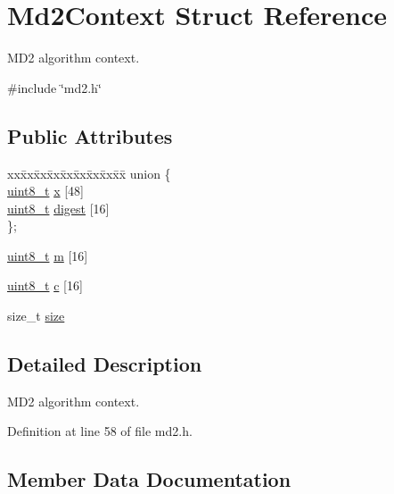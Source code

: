 \hypertarget{structMd2Context}{}\section{Md2\+Context Struct Reference}
\label{structMd2Context}


M\+D2 algorithm context.  




{\ttfamily \#include \char`\"{}md2.\+h\char`\"{}}

\subsection*{Public Attributes}
\begin{DoxyCompactItemize}
\item 
\begin{tabbing}
xx\=xx\=xx\=xx\=xx\=xx\=xx\=xx\=xx\=\kill
union \{\\
\>\hyperlink{stdint_8h_aba7bc1797add20fe3efdf37ced1182c5}{uint8\_t} \hyperlink{structMd2Context_afea5eca1b34ddac53fa3f49846167bc4}{x} \mbox{[}48\mbox{]}\\
\>\hyperlink{stdint_8h_aba7bc1797add20fe3efdf37ced1182c5}{uint8\_t} \hyperlink{structMd2Context_abbf42a8e93b5e5f22636477a6efa361a}{digest} \mbox{[}16\mbox{]}\\
\}; \\

\end{tabbing}\item 
\hyperlink{stdint_8h_aba7bc1797add20fe3efdf37ced1182c5}{uint8\+\_\+t} \hyperlink{structMd2Context_a2e9be22ee68833109610d431d0ec7752}{m} \mbox{[}16\mbox{]}
\item 
\hyperlink{stdint_8h_aba7bc1797add20fe3efdf37ced1182c5}{uint8\+\_\+t} \hyperlink{structMd2Context_abefd310eb88918040e120d90d2869256}{c} \mbox{[}16\mbox{]}
\item 
size\+\_\+t \hyperlink{structMd2Context_a257b9952c3fd0ad1c5fcc27c2883aa2f}{size}
\end{DoxyCompactItemize}


\subsection{Detailed Description}
M\+D2 algorithm context. 

Definition at line 58 of file md2.\+h.



\subsection{Member Data Documentation}
\mbox{\label{structMd2Context_a917a9f9c1323e9ab0c179a2e23c7caf7}} 
